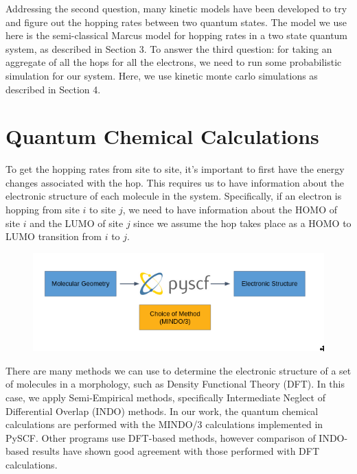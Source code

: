 \documentclass{article}
\begin{document}
Addressing the second question, many kinetic models have been developed to try and figure out the hopping rates between two quantum states. The model we use here is the semi-classical Marcus model for hopping rates in a two state quantum system, as described in Section 3. To answer the third question: for taking an aggregate of all the hops for all the electrons, we need to run some probabilistic simulation for our system. Here, we use kinetic monte carlo simulations as described in Section 4.


\section{Quantum Chemical Calculations}


To get the hopping rates from site to site, it's important to first have the energy changes associated with the hop. This requires us to have information about the electronic structure of each molecule in the system. Specifically, if an electron is hopping from site $i$ to site $j$, we need to have information about the HOMO of site $i$ and the LUMO of site $j$ since we assume the hop takes place as a HOMO to LUMO transition from $i$ to $j$. 

\begin{figure}
    \centering
    \includegraphics[scale=0.7]{fig2}
\end{figure}


There are many methods we can use to determine the electronic structure of a set of molecules in a morphology, such as Density Functional Theory (DFT). In this case, we apply Semi-Empirical methods, specifically Intermediate Neglect of Differential Overlap (INDO) methods. In our work, the quantum chemical calculations are performed with the MINDO/3 calculations implemented in PySCF. Other programs use DFT-based methods, however comparison of INDO-based results have shown good agreement with those performed with DFT calculations. 
\end{document}
